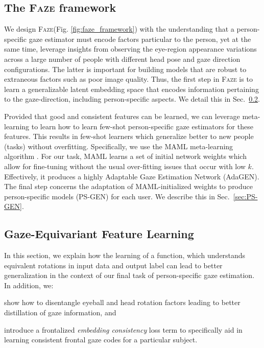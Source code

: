 \documentclass[10pt,twocolumn,letterpaper]{article}
\newcommand{\faze}[0]{\textsc{Faze}\xspace}
\begin{document}
\subsection{The \faze framework\label{sec:Faze}}
We design \faze (Fig. \ref{fig:faze_framework}) with the understanding that a person-specific gaze estimator must encode factors particular to the person, yet at the same time, leverage insights from observing the eye-region appearance variations across a large number of people with different head pose and gaze direction configurations.
The latter is important for building models that are robust to extraneous factors such as poor image quality.
Thus, the first step in \faze is to learn a generalizable latent embedding space that encodes information pertaining to the gaze-direction, including person-specific aspects.
We detail this in Sec.~\ref{sec:RotAE}.

Provided that good and consistent features can be learned, we can leverage meta-learning to learn how to learn few-shot person-specific gaze estimators for these features.
This results in few-shot learners which generalize better to new people (tasks) without overfitting. 
Specifically, we use the MAML meta-learning algorithm \cite{Finn2017ICML}. 
For our task, MAML learns a set of initial network weights which allow for fine-tuning without the usual over-fitting issues that occur with low $k$. Effectively, it produces a highly Adaptable Gaze Estimation Network (AdaGEN).
The final step concerns the adaptation of MAML-initialized weights to produce person-specific models (PS-GEN) for each user.
We describe this in Sec.~\ref{sec:PS-GEN}.


\subsection{Gaze-Equivariant Feature Learning}\label{sec:RotAE}





In this section, we explain how the learning of a function, which understands equivalent rotations in input data and output label can lead to better generalization in the context of our final task of person-specific gaze estimation.
In addition, we: \begin{inparaenum}[(a)]
\item show how to disentangle eyeball and head rotation factors leading to better distillation of gaze information,
and 
\item introduce a frontalized \emph{embedding consistency} loss term to specifically aid in learning consistent frontal gaze codes for a particular subject.
\end{inparaenum}
\end{document}
